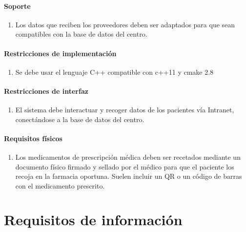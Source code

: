 \documentclass[12pt, spanish]{article}
\begin{document}
\paragraph{Soporte}
\begin{enumerate}[resume*]
  \item Los datos que reciben los proveedores deben ser adaptados para que sean compatibles con la base de datos del centro.
\end{enumerate}

\paragraph{Restricciones de implementación}
\begin{enumerate}[resume*]
  \item Se debe usar el lenguaje C++ compatible con c++11 y cmake 2.8
\end{enumerate}

\paragraph{Restricciones de interfaz}
\begin{enumerate}[resume*]
  \item  El sistema debe interactuar y recoger datos de los pacientes vía Intranet, conectándose a la base de datos del centro.
\end{enumerate}

\paragraph{Requisitos físicos}
\begin{enumerate}[resume*]
  \item Los medicamentos de prescripción médica deben ser recetados mediante un documento físico firmado y sellado por el médico para que el paciente los recoja en la farmacia oportuna. Suelen incluir un QR o un código de barras con el medicamento prescrito.
\end{enumerate}

\section{Requisitos de información}
\end{document}

